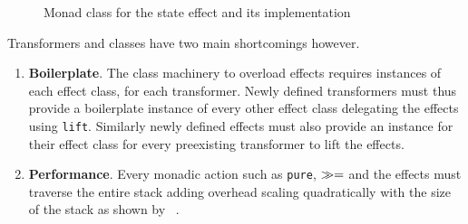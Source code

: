 \begin{figure}
  
  \caption{Monad class for the state effect and its implementation}
  \label{fig:state-state-instance}
\end{figure}

Transformers and classes have two main shortcomings however.

\begin{enumerate}
\item \textbf{Boilerplate}. The class machinery to overload effects requires
  instances of each effect class, for each transformer. Newly defined
  transformers must thus provide a boilerplate instance of every other effect
  class delegating the effects using \texttt{lift}. Similarly newly defined
  effects must also provide an instance for their effect class for
  every preexisting transformer to lift the effects.
  \item \textbf{Performance}. Every monadic action such as \texttt{pure},
    $\gg=$ and the effects must traverse the entire stack adding overhead
    scaling quadratically with the size of the stack as shown by
    \citeauthor{freer}~\cite[§4.1]{freer}.
\end{enumerate}
